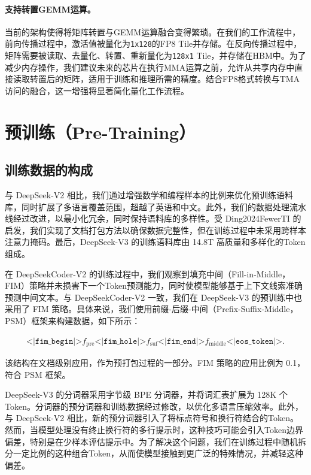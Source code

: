 \documentclass[lang=cn,a4paper,newtx]{elegantpaper}
\newcommand{\dsvii}{DeepSeek-V2}
\newcommand{\dsviii}{DeepSeek-V3}
\begin{document}
\paragraph{支持转置GEMM运算。}
当前的架构使得将矩阵转置与GEMM运算融合变得繁琐。在我们的工作流程中，前向传播过程中，激活值被量化为\texttt{1x128}的FP8 Tile并存储。在反向传播过程中，矩阵需要被读取、去量化、转置、重新量化为\texttt{128x1} Tile，并存储在HBM中。为了减少内存操作，我们建议未来的芯片在执行MMA运算之前，允许从共享内存中直接读取转置后的矩阵，适用于训练和推理所需的精度。结合FP8格式转换与TMA访问的融合，这一增强将显著简化量化工作流程。

\section{预训练（Pre-Training）}
\label{sec:pre-training}

\subsection{训练数据的构成}

与 \dsvii{} 相比，我们通过增强数学和编程样本的比例来优化预训练语料库，同时扩展了多语言覆盖范围，超越了英语和中文。此外，我们的数据处理流水线经过改进，以最小化冗余，同时保持语料库的多样性。受 Ding2024FewerTI 的启发，我们实现了文档打包方法以确保数据完整性，但在训练过程中未采用跨样本注意力掩码。最后，\dsviii{} 的训练语料库由 14.8T 高质量和多样化的Token组成。

在 DeepSeekCoder-V2 的训练过程中，我们观察到填充中间（Fill-in-Middle，FIM）策略并未损害下一个Token预测能力，同时使模型能够基于上下文线索准确预测中间文本。与 DeepSeekCoder-V2 一致，我们在 \dsviii{} 的预训练中也采用了 FIM 策略。具体来说，我们使用前缀-后缀-中间（Prefix-Suffix-Middle，PSM）框架来构建数据，如下所示：

\begin{align}
\texttt{<|fim\_begin|>}f_{\text{pre}}\texttt{<|fim\_hole|>}f_{\text{suf}}\texttt{<|fim\_end|>}f_{\text{middle}}\texttt{<|eos\_token|>} . \nonumber
\end{align}

该结构在文档级别应用，作为预打包过程的一部分。FIM 策略的应用比例为 0.1，符合 PSM 框架。

\dsviii{} 的分词器采用字节级 BPE 分词器，并将词汇表扩展为 128K 个Token。分词器的预分词器和训练数据经过修改，以优化多语言压缩效率。此外，与 \dsvii{} 相比，新的预分词器引入了将标点符号和换行符结合的Token。然而，当模型处理没有终止换行符的多行提示时，这种技巧可能会引入Token边界偏差，特别是在少样本评估提示中。为了解决这个问题，我们在训练过程中随机拆分一定比例的这种组合Token，从而使模型接触到更广泛的特殊情况，并减轻这种偏差。
\end{document}
